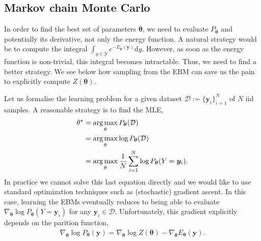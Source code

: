 \subsection{Markov chain Monte Carlo}
In order to find the best set of parameters $\bm{\theta}$, we need to evaluate $P_{\bm{\theta}}$ and potentially its derivative, not only the energy function.
A natural strategy would be to compute the integral $\int_{y\in \mathcal{Y}}e^{-E_{\bm{\theta}}(\bm{y})} \text{d}y$. However, as soon as the energy function is non-trivial, this integral becomes intractable. Thus, we need to find a better strategy. We see below how sampling from the EBM can save us the pain to explicitly compute $Z(\bm{\theta})$.

Let us formalise the learning problem for a given dataset $\mathcal{D} := \{\bm{y}_i\}_{i=1}^N$ of $N$ iid samples. A reasonable strategy is to find the MLE,
\begin{align}
  \theta^\star &= \operatorname*{arg\,max}_\theta P_{\bm{\theta}}(\mathcal{D})\\
  &= \operatorname*{arg\,max}_\theta \log P_{\bm{\theta}}(\mathcal{D})\\
  &= \operatorname*{arg\,max}_\theta \frac{1}{N} \sum^N_{i=1} \log P_{\bm{\theta}}(Y=\bm{y}_i).
\end{align}
In practice we cannot solve this last equation directly and we would like to use standard optimization techniques such as (stochastic) gradient ascent. In this case, learning the EBMs eventually reduces to being able to evaluate $\nabla_{\bm{\theta}} \log P_{\bm{\theta}}(Y=\bm{y}_i)$ for any $\bm{y}_i \in \mathcal{D}$. Unfortunately, this gradient explicitly depends on the parition function,
\begin{align}
  \nabla_{\bm{\theta}} \log P_{\bm{\theta}}(\bm{y}) = \nabla_{\bm{\theta}} \log Z(\bm{\theta}) -\nabla_{\bm{\theta}} E_{\bm{\theta}}(\bm{y}).
\end{align}

